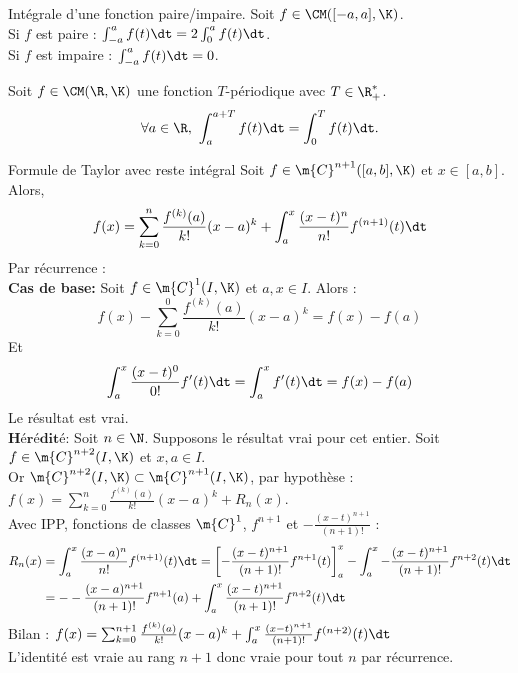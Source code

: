 \documentclass[11pt]{article}
\begin{document}
\begin{corr}{Intégrale d'une fonction paire/impaire.}{}
    Soit $f\in\CM([-a,a],\K)$.\\
    Si $f$ est paire : $\int_{-a}^af(t)\dt=2\int_0^af(t)\dt$.\\
    Si $f$ est impaire : $\int_{-a}^af(t)\dt=0$.
\end{corr}

\begin{corr}{}{}
    Soit $f\in\CM(\R,\K)$ une fonction $T$-périodique avec $T\in\R^*_+$.
    \begin{equation*}
        \forall a\in\R, ~ \int_a^{a+T}f(t)\dt=\int_0^Tf(t)\dt.
    \end{equation*}
\end{corr}

\begin{thm}{Formule de Taylor avec reste intégral}{}
    Soit $f\in\m{C}^{n+1}([a,b],\K)$ et $x\in[a,b]$. Alors,
    \begin{equation*}
        f(x)=\sum_{k=0}^n\frac{f^{(k)}(a)}{k!}(x-a)^k+\int_a^x\frac{(x-t)^n}{n!}f^{(n+1)}(t)\dt
    \end{equation*}
    \tcblower
    Par récurrence :\\
    \textbf{Cas de base:} Soit $f\in\m{C}^1(I,\K)$ et $a,x\in I$. Alors :
    \begin{equation*}
        f(x)-\sum_{k=0}^0\frac{f^{(k)}(a)}{k!}(x-a)^k=f(x)-f(a)
    \end{equation*}
    Et
    \begin{equation*}
        \int_a^x\frac{(x-t)^0}{0!}f'(t)\dt=\int_a^xf'(t)\dt=f(x)-f(a)
    \end{equation*}
    Le résultat est vrai.\\
    $\textbf{Hérédité:}$ Soit $n\in\N$. Supposons le résultat vrai pour cet entier. Soit $f\in\m{C}^{n+2}(I,\K)$ et $x,a\in I$.\\
    Or $\m{C}^{n+2}(I,\K)\subset\m{C}^{n+1}(I,\K)$, par hypothèse : $f(x)=\sum_{k=0}^n\frac{f^{(k)}(a)}{k!}(x-a)^k+R_n(x)$.\\
    Avec IPP, fonctions de classes $\m{C}^1$, $f^{n+1}$ et $-\frac{(x-t)^{n+1}}{(n+1)!}$ :
    \begin{align*}
        R_n(x)&= \int_a^x\frac{(x-a)^n}{n!}f^{(n+1)}(t)\dt = \left[ -\frac{(x-t)^{n+1}}{(n+1)!}f^{n+1}(t) \right]_a^x - \int_a^x-\frac{(x-t)^{n+1}}{(n+1)!}f^{n+2}(t)\dt\\
        &=--\frac{(x-a)^{n+1}}{(n+1)!}f^{n+1}(a)+\int_a^x\frac{(x-t)^{n+1}}{(n+1)!}f^{n+2}(t)\dt
    \end{align*}
    Bilan : $f(x)=\sum_{k=0}^{n+1}\frac{f^{(k)}(a)}{k!}(x-a)^k+\int_a^x\frac{(x-t)^{n+1}}{(n+1)!}f^{(n+2)}(t)\dt$\\
    L'identité est vraie au rang $n+1$ donc vraie pour tout $n$ par récurrence.
\end{thm}
\end{document}
